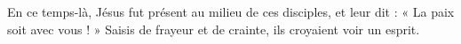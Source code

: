 En ce temps-là, Jésus fut présent au milieu de ces disciples,
	et leur dit : « La paix soit avec vous ! »
Saisis de frayeur et de crainte, ils croyaient voir un esprit.